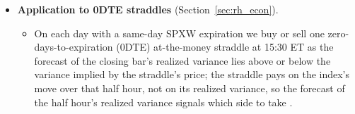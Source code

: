 \begin{itemize}
\begin{enumerate}
  \item \textbf{The gain holds under QLIKE, not under squared-error loss.}
    \begin{itemize}
    \item On every bar the full set has a higher mean squared error than the HAR benchmark in
      \rhcaNMseHigherBarSpan{} of the \rhorAfPairs{} classes (significantly in \rhcaNMseHigherSigBarSpan).
    \item A handful of days in the COVID-19 crash account for it: on every bar of \rhcaYearsOos, the \rhcaTopDays{}
      days with the largest excess squared error, all between \rhcaTopFirstBarOos{} and \rhcaTopLastBarOos, carry
      \rhcaLinTopShareBarOosRng\% of the full set's excess squared error in the penalized linear models and
      \rhcaTreeTopShareBarOosRng\% in the tree ensembles. Without the days from \rhcaCrashStart{} to \rhcaCrashEnd{}
      the full set has the lower mean squared error in \rhcaNMseLowerBarOosExCrash{} of the classes,
      \rhcaNMseLowerSigBarOosExCrash{} of them significantly.
    \end{itemize}
  \end{enumerate}
\item \textbf{Application to 0DTE straddles} (Section~\ref{sec:rh_econ}).
  \begin{itemize}
  \item On each day with a same-day SPXW expiration we buy or sell one zero-days-to-expiration (0DTE) at-the-money
    straddle at 15:30 ET as the forecast of the closing bar's realized variance lies above or below the variance
    implied by the straddle's price; the straddle pays on the index's move over that half hour, not on its realized
    variance, so the forecast of the half hour's realized variance signals which side to take
    \citep{EngleHongKaneNoh1993,NohEngleKane1994}.

\end{itemize}
\end{itemize}
